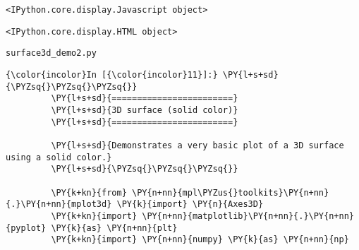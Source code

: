     
    \begin{verbatim}
<IPython.core.display.Javascript object>
    \end{verbatim}

    
    
    \begin{verbatim}
<IPython.core.display.HTML object>
    \end{verbatim}

    
    \texttt{surface3d\_demo2.py}

    \begin{Verbatim}[commandchars=\\\{\}]
{\color{incolor}In [{\color{incolor}11}]:} \PY{l+s+sd}{\PYZsq{}\PYZsq{}\PYZsq{}}
         \PY{l+s+sd}{========================}
         \PY{l+s+sd}{3D surface (solid color)}
         \PY{l+s+sd}{========================}
         
         \PY{l+s+sd}{Demonstrates a very basic plot of a 3D surface using a solid color.}
         \PY{l+s+sd}{\PYZsq{}\PYZsq{}\PYZsq{}}
         
         \PY{k+kn}{from} \PY{n+nn}{mpl\PYZus{}toolkits}\PY{n+nn}{.}\PY{n+nn}{mplot3d} \PY{k}{import} \PY{n}{Axes3D}
         \PY{k+kn}{import} \PY{n+nn}{matplotlib}\PY{n+nn}{.}\PY{n+nn}{pyplot} \PY{k}{as} \PY{n+nn}{plt}
         \PY{k+kn}{import} \PY{n+nn}{numpy} \PY{k}{as} \PY{n+nn}{np}
\end{Verbatim}


